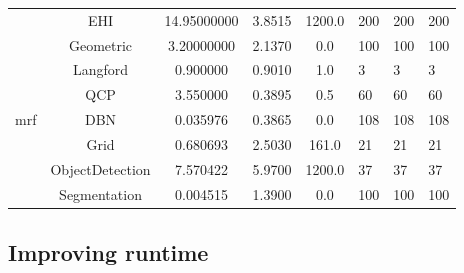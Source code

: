 \begin{table}
\begin{tabu}{ccS[round-mode=places,round-precision=3]
					  S[round-mode=places,round-precision=0]
					  S[round-mode=places,round-precision=0]HHH}
				&	EHI	&	14.95000000	&	3.8515	&	1200.0	&	200	&	200	&	200 \\
	&	Geometric	&	3.20000000	&	2.1370	&	0.0	&	100	&	100	&	100 \\
	&	Langford	&	0.900000	&	0.9010	&	1.0	&	3	&	3	&	3 \\
				&	QCP	&	3.550000	&	0.3895	&	0.5	&	60	&	60	&	60 \\
			\acrshort{mrf}	&	DBN	&	0.035976	&	0.3865	&	0.0	&	108	&	108	&	108 \\
				&	Grid	&	0.680693	&	2.5030	&	161.0	&	21	&	21	&	21 \\
				&	ObjectDetection	&	7.570422	&	5.9700	&	1200.0	&	37	&	37	&	37 \\
				&	Segmentation	&	0.004515	&	1.3900	&	0.0	&	100	&	100	&	100 \\
		\bottomrule
	\end{tabu}
\end{table}

\subsection{Improving runtime}
